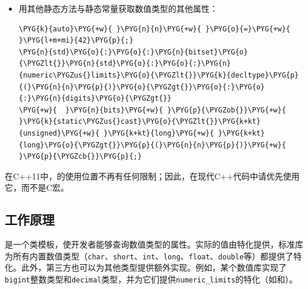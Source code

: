 \begin{itemize}

\item 用其他静态方法与静态常量获取数值类型的其他属性：



\begin{codeblockbg}
\begin{Verbatim}[commandchars=\\\{\},breaklines=true,breakanywhere=true,fontsize=\codefont,xleftmargin=17bp]
\PYG{k}{auto}\PYG{+w}{ }\PYG{n}{n}\PYG{+w}{ }\PYG{o}{=}\PYG{+w}{ }\PYG{l+m+mi}{42}\PYG{p}{;}
\PYG{n}{std}\PYG{o}{:}\PYG{o}{:}\PYG{n}{bitset}\PYG{o}{\PYGZlt{}}\PYG{n}{std}\PYG{o}{:}\PYG{o}{:}\PYG{n}{numeric\PYGZus{}limits}\PYG{o}{\PYGZlt{}}\PYG{k}{decltype}\PYG{p}{(}\PYG{n}{n}\PYG{p}{)}\PYG{o}{\PYGZgt{}}\PYG{o}{:}\PYG{o}{:}\PYG{n}{digits}\PYG{o}{\PYGZgt{}}
\PYG{+w}{  }\PYG{n}{bits}\PYG{+w}{ }\PYG{p}{\PYGZob{}}\PYG{+w}{ }\PYG{k}{static\PYGZus{}cast}\PYG{o}{\PYGZlt{}}\PYG{k+kt}{unsigned}\PYG{+w}{ }\PYG{k+kt}{long}\PYG{+w}{ }\PYG{k+kt}{long}\PYG{o}{\PYGZgt{}}\PYG{p}{(}\PYG{n}{n}\PYG{p}{)}\PYG{+w}{ }\PYG{p}{\PYGZcb{}}\PYG{p}{;}
\end{Verbatim}
\end{codeblockbg}

\end{itemize}



\begin{myNote}
在C++11中，的使用位置不再有任何限制；因此，在现代C++代码中请优先使用它，而不是C宏。
\end{myNote}



\subsection{工作原理}



是一个类模板，使开发者能够查询数值类型的属性。实际的值由特化提供，标准库为所有内置数值类型（\texttt{char}、\texttt{short}、\texttt{int}、\texttt{long}、\texttt{float}、\texttt{double}等）都提供了特化。此外，第三方也可以为其他类型提供额外实现。例如，某个数值库实现了\texttt{bigint}整数类型和\texttt{decimal}类型，并为它们提供\texttt{numeric\_\allowbreak{}limits}的特化（如和）。


